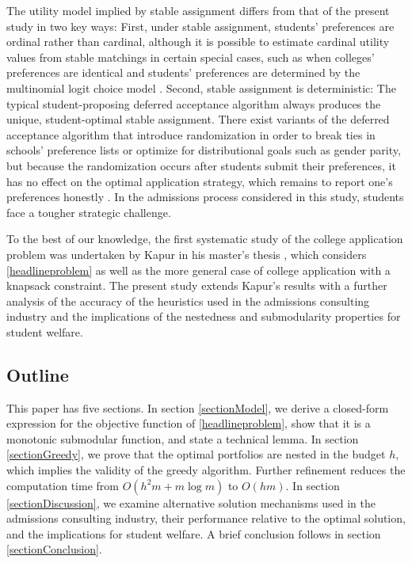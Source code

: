 The utility model implied by stable assignment differs from that of the present study in two key ways: First, under stable assignment, students' preferences are ordinal rather than cardinal, although it is possible to estimate cardinal utility values from stable matchings in certain special cases, such as when colleges' preferences are identical and students' preferences are determined by the multinomial logit choice model \cite{kapur2021}. Second, stable assignment is deterministic: The typical student-proposing deferred acceptance algorithm always produces the unique, student-optimal stable assignment. There exist variants of the deferred acceptance algorithm that introduce randomization in order to break ties in schools' preference lists or optimize for distributional goals such as gender parity, but because the randomization occurs after students submit their preferences, it has no effect on the optimal application strategy, which remains to report one's preferences honestly \cite{ashlagiandnikzad2020,bodohcreed2020}. In the admissions process considered in this study, students face a tougher strategic challenge.

To the best of our knowledge, the first systematic study of the college application problem was undertaken by Kapur in his master's thesis \cite{kapur2022}, which considers \eqref{headlineproblem} as well as the more general case of college application with a knapsack constraint. The present study extends Kapur's results with a further analysis of the accuracy of the heuristics used in the admissions consulting industry and the implications of the nestedness and submodularity properties for student welfare.

\subsection{Outline}

This paper has five sections. In section \ref{sectionModel}, we derive a closed-form expression for the objective function of \eqref{headlineproblem}, show that it is a monotonic submodular function, and state a technical lemma. In section \ref{sectionGreedy}, we prove that the optimal portfolios are nested in the budget $h$, which implies the validity of the greedy algorithm. Further refinement reduces the computation time from $O(h^2 m + m\log m)$ to $O(hm)$. In section \ref{sectionDiscussion}, we examine alternative solution mechanisms used in the admissions consulting industry, their performance relative to the optimal solution, and the implications for student welfare. A brief conclusion follows in section \ref{sectionConclusion}.







